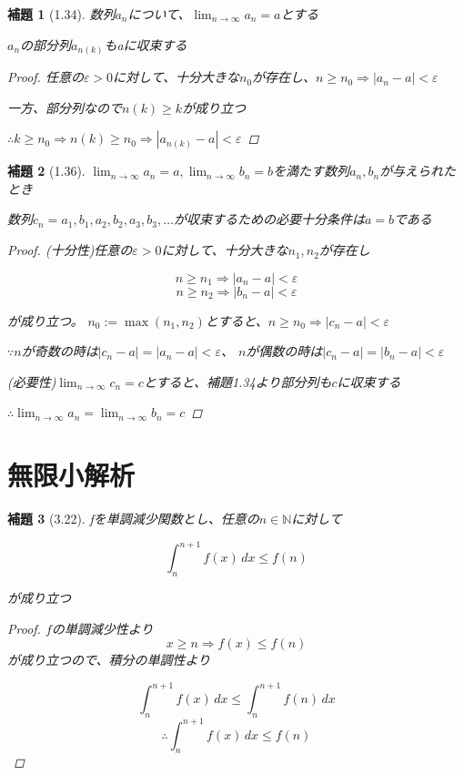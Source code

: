 \documentclass{book}
\newtheorem*{lemma}{補題}
\begin{document}
\begin{lemma}[1.34]
  数列$a_n$について、$\lim_{n \to \infty} a_n = a$とする

  $a_n$の部分列$a_{n(k)}$もaに収束する

  \begin{proof}
    任意の$\varepsilon  > 0$に対して、十分大きな$n_0$が存在し、$n \geq n_0 \Rightarrow |a_n
    - a| < \varepsilon $

    一方、部分列なので$n(k) \geq k$が成り立つ

    $\therefore k \geq n_0 \Rightarrow n(k) \geq n_0 \Rightarrow
    |a_{n(k)} - a| < \varepsilon $
  \end{proof}
\end{lemma}

\begin{lemma}[1.36]
  $\lim_{n \to \infty}a_n = a, \lim_{n \to \infty}b_n = b$を満たす数列$a_n,
  b_n$が与えられたとき

  数列$c_n = a_1,b_1,a_2,b_2,a_3,b_3,\dots$が収束するための必要十分条件は$a = b$である

  \begin{proof}
    (十分性)任意の$\varepsilon > 0$に対して、十分大きな$n_1, n_2$が存在し

    \[n \geq n_1 \Rightarrow |a_n - a| < \varepsilon\]
    \[n \geq n_2 \Rightarrow |b_n - a| < \varepsilon\]

    が成り立つ。
    $n_0 := \max(n_1, n_2)$とすると、$n \geq n_0 \Rightarrow |c_n - a| < \varepsilon$

    $\because n$が奇数の時は$|c_n - a| = |a_n - a| < \varepsilon$、
    $n$が偶数の時は$|c_n - a| = |b_n - a| < \varepsilon$

    (必要性)$\lim_{n \to \infty}c_n = c$とすると、補題1.34より部分列も$c$に収束する

    $\therefore \lim_{n \to \infty}a_n = \lim_{n \to \infty}b_n = c$
  \end{proof}
\end{lemma}

\section{無限小解析}

\begin{lemma}[3.22]
  fを単調減少関数とし、任意の$n \in \mathbb{N}$に対して

  \[
    \int_{n}^{n+1}f(x)\,dx \leq f(n)
  \]

  が成り立つ

  \begin{proof}
    $f$の単調減少性より
    \[
      x \geq n \Rightarrow f(x) \leq f(n)
    \]
    が成り立つので、積分の単調性より

    \[
      \int_{n}^{n+1} f(x) \,dx \leq \int_{n}^{n+1} f(n) \,dx
    \]
    \[
      \therefore \int_{n}^{n+1}f(x)\,dx \leq f(n)
    \]
  \end{proof}
\end{lemma}
\end{document}
